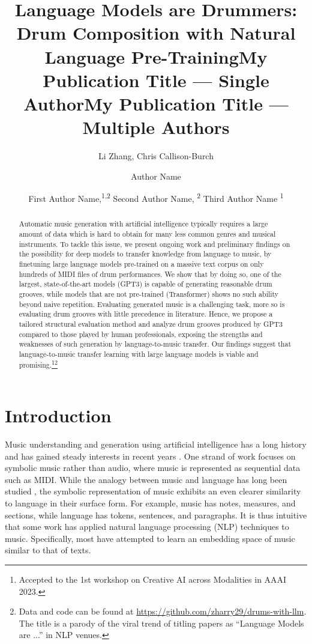 \documentclass[letterpaper]{article} %
\title{Language Models are Drummers:\\Drum Composition with Natural Language Pre-Training}
\author{
    Li Zhang,
    Chris Callison-Burch
}
\title{My Publication Title --- Single Author}
\author {
    Author Name
}
\title{My Publication Title --- Multiple Authors}
\author {
    First Author Name,\textsuperscript{\rm 1,\rm 2}
    Second Author Name, \textsuperscript{\rm 2}
    Third Author Name \textsuperscript{\rm 1}
}
\begin{document}
\maketitle

\begin{abstract}
Automatic music generation with artificial intelligence typically requires a large amount of data which is hard to obtain for many less common genres and musical instruments. To tackle this issue, we present ongoing work and preliminary findings on the possibility for deep models to transfer knowledge from language to music, by finetuning large language models pre-trained on a massive text corpus on only hundreds of MIDI files of drum performances. We show that by doing so, one of the largest, state-of-the-art models (GPT3) is capable of generating reasonable drum grooves, while models that are not pre-trained (Transformer) shows no such ability beyond naive repetition. Evaluating generated music is a challenging task, more so is evaluating drum grooves with little precedence in literature. Hence, we propose a tailored structural evaluation method and analyze drum grooves produced by GPT3 compared to those played by human professionals, exposing the strengths and weaknesses of such generation by language-to-music transfer. Our findings suggest that language-to-music transfer learning with large language models is viable and promising.\footnote{Accepted to the 1st workshop on Creative AI across Modalities in AAAI 2023.}\footnote{Data and code can be found at \url{https://github.com/zharry29/drums-with-llm}. The title is a parody of the viral trend of titling papers as ``Language Models are ...'' in NLP venues.}
\end{abstract}

\section{Introduction}
Music understanding and generation using artificial intelligence has a long history \cite{roads1985research} and has gained steady interests in recent years \cite{kaliakatsos2020artificial}. One strand of work focuses on symbolic music rather than audio, where music is represented as sequential data such as MIDI. While the analogy between music and language has long been studied \cite{10.1525/mp.2004.21.3.289}, the symbolic representation of music exhibits an even clearer similarity to language in their surface form. For example, music has notes, measures, and sections, while language has tokens, sentences, and paragraphs. It is thus intuitive that some work has applied natural language processing (NLP) techniques to music. Specifically, most have attempted to learn an embedding space of music \cite{liang2020pirhdy} similar to that of texts.
\end{document}
